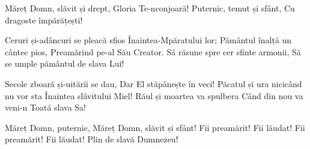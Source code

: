 \beginchorus
Măreț Domn, slăvit și drept,
Gloria Te-nconjoară!
Puternic, temut și sfânt,
Cu dragoste împărățești!
\endchorus

\beginverse
Ceruri și-adâncuri se pleacă sfios
Înaintea-Mpăratului lor;
Pământul înalță un cântec pios,
Preamărind pe-al Său Creator.
Să răsune spre cer sfinte armonii,
Să se umple pământul de slava Lui!
\endverse

\beginverse
Secole zboară și-uitării se dau,
Dar El stăpânește în veci!
Păcatul și ura nicicând nu vor sta
Înaintea slăvitului Miel!
Răul și moartea va spulbera
Când din nou va veni-n
Toată slava Sa!
\endverse

\beginverse*
Măreț Domn, puternic,
Măreț Domn, slăvit și sfânt!
Fii preamărit! Fii lăudat!
Fii preamărit! Fii lăudat!
Plin de slavă Dumnezeu!
\endverse
\endsong